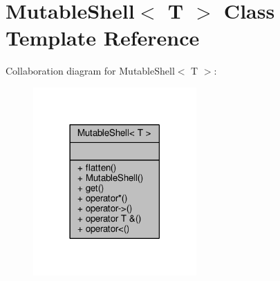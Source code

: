 \hypertarget{classMutableShell}{}\section{Mutable\+Shell$<$ T $>$ Class Template Reference}
\label{classMutableShell}


Collaboration diagram for Mutable\+Shell$<$ T $>$\+:
\nopagebreak
\begin{figure}[H]
\begin{center}
\leavevmode
\includegraphics[width=177pt]{dd/d0d/classMutableShell__coll__graph}
\end{center}
\end{figure}
